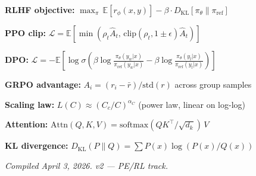 \textbf{RLHF objective:}
$\max_\pi\, \mathbb{E}[r_\phi(x,y)] - \beta \cdot D_{\text{KL}}[\pi_\theta \| \pi_{\text{ref}}]$

\textbf{PPO clip:} $\mathcal{L} = \mathbb{E}[\min(\rho_t \hat{A}_t,\, \text{clip}(\rho_t, 1{\pm}\epsilon)\hat{A}_t)]$

\textbf{DPO:} $\mathcal{L} = -\mathbb{E}[\log \sigma(\beta \log \frac{\pi_\theta(y_w|x)}{\pi_{\text{ref}}(y_w|x)} - \beta \log \frac{\pi_\theta(y_l|x)}{\pi_{\text{ref}}(y_l|x)})]$

\textbf{GRPO advantage:} $A_i = (r_i - \bar{r}) / \text{std}(r)$ across group samples

\textbf{Scaling law:} $L(C) \approx (C_c / C)^{\alpha_C}$ \quad (power law, linear on log-log)

\textbf{Attention:} $\text{Attn}(Q,K,V) = \text{softmax}(QK^\top / \sqrt{d_k})\, V$

\textbf{KL divergence:} $D_{\text{KL}}(P\|Q) = \sum P(x) \log(P(x)/Q(x))$

\normalsize

\vfill
\begin{center}
\small\textit{Compiled April 3, 2026. v2 --- PE/RL track.}
\end{center}

